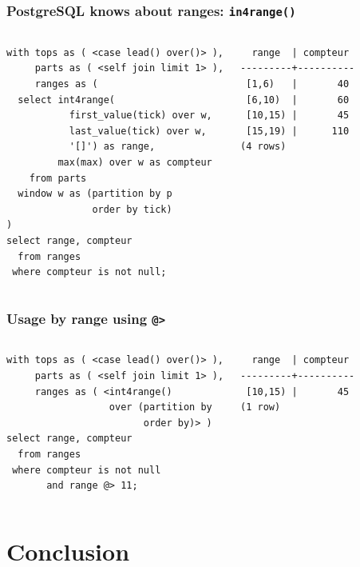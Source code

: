 \documentclass{beamer}
\begin{document}
\begin{frame}[fragile]
  \frametitle{PostgreSQL knows about ranges: \texttt{in4range()}}

\begin{columns}
\begin{verbatim}
with tops as ( <case lead() over()> ),
     parts as ( <self join limit 1> ),
     ranges as (
  select int4range(
           first_value(tick) over w,
           last_value(tick) over w,
           '[]') as range,
         max(max) over w as compteur
    from parts
  window w as (partition by p
               order by tick)
)
select range, compteur
  from ranges
 where compteur is not null;
\end{verbatim}
\begin{verbatim}
  range  | compteur 
---------+----------
 [1,6)   |       40
 [6,10)  |       60
 [10,15) |       45
 [15,19) |      110
(4 rows)
\end{verbatim}
\end{columns}
\end{frame}

\begin{frame}[fragile]
  \frametitle{Usage by range using \texttt{@>}}

\begin{columns}
\begin{verbatim}
with tops as ( <case lead() over()> ),
     parts as ( <self join limit 1> ),
     ranges as ( <int4range()
                  over (partition by
                        order by)> )
select range, compteur
  from ranges
 where compteur is not null
       and range @> 11;
\end{verbatim}

\begin{verbatim}
  range  | compteur 
---------+----------
 [10,15) |       45
(1 row)
\end{verbatim}
\end{columns}
\end{frame}


\section{Conclusion}

\end{document}
